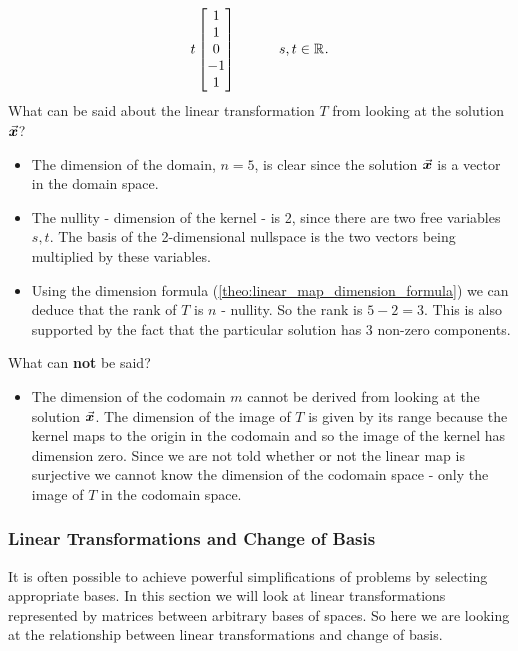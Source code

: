 \documentclass[../MathsNotesBase.tex]{subfiles}
\begin{document}
{\begin{exe}
{\[						t \begin{bmatrix}1\\1\\0\\-1\\1\end{bmatrix}
						\hspace{30pt} s,t \in \mathbb{R}^{}.
				\]
				What can be said about the linear transformation $T$ from looking at the solution $\vec{\bm{x}}$?
				\begin{itemize}
					\item{The dimension of the domain, ${ n = 5 }$, is clear since the solution $\vec{\bm{x}}$ is a vector in the domain space.}
					\item{The nullity - dimension of the kernel - is 2, since there are two free variables ${ s,t }$. The basis of the 2-dimensional nullspace is the two vectors being multiplied by these variables.}
					\item{Using the dimension formula (\autoref{theo:linear_map_dimension_formula}) we can deduce that the rank of $T$ is $n$ - nullity. So the rank is ${ 5 - 2 = 3 }$. This is also supported by the fact that the particular solution has 3 non-zero components.}
				\end{itemize}
				What can \textbf{not} be said?
				\begin{itemize}
					\item{The dimension of the codomain $m$ cannot be derived from looking at the solution $\vec{\bm{x}}$. The dimension of the image of $T$ is given by its range because the kernel maps to the origin in the codomain and so the image of the kernel has dimension zero. Since we are not told whether or not the linear map is surjective we cannot know the dimension of the codomain space - only the image of $T$ in the codomain space.}
				\end{itemize}
				\bigskip
			}
			\label{ex:minimal-linear-transformation}
		\end{exe}
	
		\bigskip\bigskip
		\subsubsection{Linear Transformations and Change of Basis}\label{sssection:linear-trans-and-change-of-basis}
		\medskip
		It is often possible to achieve powerful simplifications of problems by selecting appropriate bases. In this section we will look at linear transformations represented by matrices between arbitrary bases of spaces. So here we are looking at the relationship between linear transformations and change of basis.\\

}
\end{document}
